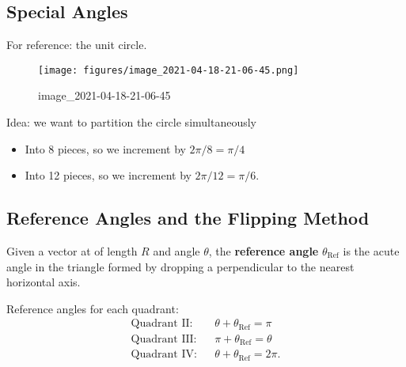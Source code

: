 \hypertarget{special-angles}{%
\subsection{Special Angles}\label{special-angles}}

For reference: the unit circle.

\begin{figure}
\centering
\texttt{[image: figures/image\_2021-04-18-21-06-45.png]}
\caption{image\_2021-04-18-21-06-45}
\end{figure}

\begin{remark}

Idea: we want to partition the circle simultaneously

\begin{itemize}
\tightlist
\item
  Into 8 pieces, so we increment by \(2\pi/8 = \pi/4\)
\item
  Into 12 pieces, so we increment by \(2\pi/12 = \pi/6\).
\end{itemize}

\end{remark}

\begin{proposition}


\end{proposition}

\hypertarget{reference-angles-and-the-flipping-method}{%
\subsection{Reference Angles and the Flipping
Method}\label{reference-angles-and-the-flipping-method}}

\begin{definition}

Given a vector at of length \(R\) and angle \(\theta\), the
\textbf{reference angle} \({ \theta_{\mathrm{Ref} } }\) is the acute
angle in the triangle formed by dropping a perpendicular to the nearest
horizontal axis.

\end{definition}

\begin{proposition}[?]

Reference angles for each quadrant:
\begin{align*}
\text{Quadrant II}: && \theta + { \theta_{\mathrm{Ref} } }= \pi \\
\text{Quadrant III}: && \pi + { \theta_{\mathrm{Ref} } }= \theta \\
\text{Quadrant IV}: && \theta + { \theta_{\mathrm{Ref} } }= 2\pi
.\end{align*}

\end{proposition}


